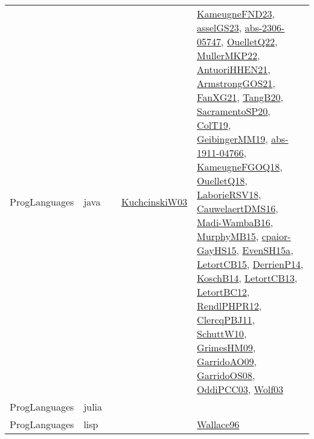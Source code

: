 {\begin{longtable}{llp{6cm}p{6cm}p{6cm}}
ProgLanguages & java  &  & \href{articles/KuchcinskiW03.pdf}{KuchcinskiW03}\cite{KuchcinskiW03} & \href{papers/KameugneFND23.pdf}{KameugneFND23}\cite{KameugneFND23}, \href{papers/asselGS23.pdf}{asselGS23}\cite{asselGS23}, \href{articles/abs-2306-05747.pdf}{abs-2306-05747}\cite{abs-2306-05747}, \href{papers/OuelletQ22.pdf}{OuelletQ22}\cite{OuelletQ22}, \href{articles/MullerMKP22.pdf}{MullerMKP22}\cite{MullerMKP22}, \href{papers/AntuoriHHEN21.pdf}{AntuoriHHEN21}\cite{AntuoriHHEN21}, \href{papers/ArmstrongGOS21.pdf}{ArmstrongGOS21}\cite{ArmstrongGOS21}, \href{articles/FanXG21.pdf}{FanXG21}\cite{FanXG21}, \href{papers/TangB20.pdf}{TangB20}\cite{TangB20}, \href{articles/SacramentoSP20.pdf}{SacramentoSP20}\cite{SacramentoSP20}, \href{papers/ColT19.pdf}{ColT19}\cite{ColT19}, \href{papers/GeibingerMM19.pdf}{GeibingerMM19}\cite{GeibingerMM19}, \href{articles/abs-1911-04766.pdf}{abs-1911-04766}\cite{abs-1911-04766}, \href{papers/KameugneFGOQ18.pdf}{KameugneFGOQ18}\cite{KameugneFGOQ18}, \href{papers/OuelletQ18.pdf}{OuelletQ18}\cite{OuelletQ18}, \href{articles/LaborieRSV18.pdf}{LaborieRSV18}\cite{LaborieRSV18}, \href{papers/CauwelaertDMS16.pdf}{CauwelaertDMS16}\cite{CauwelaertDMS16}, \href{papers/Madi-WambaB16.pdf}{Madi-WambaB16}\cite{Madi-WambaB16}, \href{papers/MurphyMB15.pdf}{MurphyMB15}\cite{MurphyMB15}, \href{papers/cpaior-GayHS15.pdf}{cpaior-GayHS15}\cite{cpaior-GayHS15}, \href{articles/EvenSH15a.pdf}{EvenSH15a}\cite{EvenSH15a}, \href{articles/LetortCB15.pdf}{LetortCB15}\cite{LetortCB15}, \href{papers/DerrienP14.pdf}{DerrienP14}\cite{DerrienP14}, \href{papers/KoschB14.pdf}{KoschB14}\cite{KoschB14}, \href{papers/LetortCB13.pdf}{LetortCB13}\cite{LetortCB13}, \href{papers/LetortBC12.pdf}{LetortBC12}\cite{LetortBC12}, \href{papers/RendlPHPR12.pdf}{RendlPHPR12}\cite{RendlPHPR12}, \href{papers/ClercqPBJ11.pdf}{ClercqPBJ11}\cite{ClercqPBJ11}, \href{papers/SchuttW10.pdf}{SchuttW10}\cite{SchuttW10}, \href{papers/GrimesHM09.pdf}{GrimesHM09}\cite{GrimesHM09}, \href{articles/GarridoAO09.pdf}{GarridoAO09}\cite{GarridoAO09}, \href{articles/GarridoOS08.pdf}{GarridoOS08}\cite{GarridoOS08}, \href{papers/OddiPCC03.pdf}{OddiPCC03}\cite{OddiPCC03}, \href{papers/Wolf03.pdf}{Wolf03}\cite{Wolf03}\\
ProgLanguages & julia  &  &  & \\
ProgLanguages & lisp &  &  & \href{articles/Wallace96.pdf}{Wallace96}\cite{Wallace96}\\

\end{longtable}}
